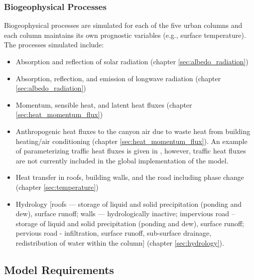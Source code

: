 \documentclass[12pt,authoryear]{elsarticle}
\numberwithin{equation}{section} %
\begin{document}
\subsubsection{Biogeophysical Processes}
%
Biogeophysical processes are simulated for each of the five urban columns and each
column maintains its own prognostic variables (e.g., surface temperature). The processes simulated include:
\begin{itemize}
\item Absorption and reflection of solar radiation (chapter \ref{sec:albedo_radiation}) 
\item Absorption, reflection, and emission of longwave radiation (chapter \ref{sec:albedo_radiation}) 
\item Momentum, sensible heat, and latent heat fluxes (chapter \ref{sec:heat_momentum_flux})
\item Anthropogenic heat fluxes to the canyon air due to waste heat from building heating/air conditioning (chapter \ref{sec:heat_momentum_flux}). An example of parameterizing traffic heat fluxes is given in \citet{OLESONETAL08J.Appl.Meteorol.Climatol.b}, however, traffic heat fluxes are not currently included in the global implementation of the model.
\item Heat transfer in roofs, building walls, and the road including phase change
(chapter \ref{sec:temperature})
\item Hydrology [roofs --- storage of liquid and solid precipitation (ponding and
dew), surface runoff; walls --- hydrologically inactive; impervious road –
storage of liquid and solid precipitation (ponding and dew), surface runoff;
pervious road - infiltration, surface runoff, sub-surface drainage,
redistribution of water within the column] (chapter \ref{sec:hydrology}).
\end{itemize}

\subsection{Model Requirements}
\end{document}
